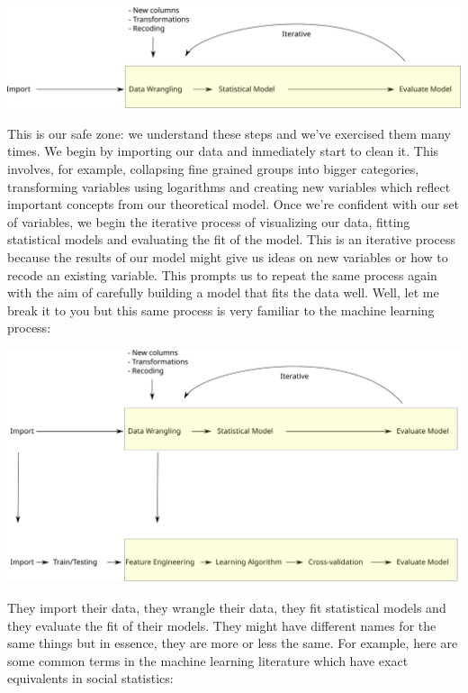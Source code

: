 \documentclass[
]{book}
\begin{document}
\begin{center}\includegraphics[width=0.99\linewidth]{./img/socsci_wflow1_smaller} \end{center}

This is our safe zone: we understand these steps and we've exercised them many times. We begin by importing our data and inmediately start to clean it. This involves, for example, collapsing fine grained groups into bigger categories, transforming variables using logarithms and creating new variables which reflect important concepts from our theoretical model. Once we're confident with our set of variables, we begin the iterative process of visualizing our data, fitting statistical models and evaluating the fit of the model. This is an iterative process because the results of our model might give us ideas on new variables or how to recode an existing variable. This prompts us to repeat the same process again with the aim of carefully building a model that fits the data well. Well, let me break it to you but this same process is very familiar to the machine learning process:

\begin{center}\includegraphics[width=0.99\linewidth]{./img/socsci_wflow3_smaller} \end{center}

They import their data, they wrangle their data, they fit statistical models and they evaluate the fit of their models. They might have different names for the same things but in essence, they are more or less the same. For example, here are some common terms in the machine learning literature which have exact equivalents in social statistics:
\end{document}
